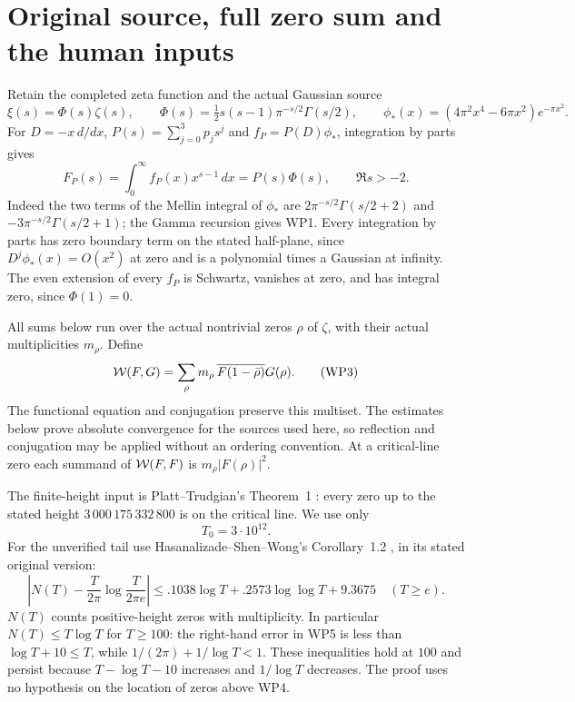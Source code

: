 \documentclass[11pt]{article}
\begin{document}
\section{Original source, full zero sum and the human inputs}
Retain the completed zeta function and the actual Gaussian source
\[
 \xi(s)=\Phi(s)\zeta(s),\qquad
 \Phi(s)=\tfrac12s(s-1)\pi^{-s/2}\Gamma(s/2),\qquad
 \phi_*(x)=(4\pi^2x^4-6\pi x^2)e^{-\pi x^2}.                 \tag{WP1}
\]
For $D=-x\,d/dx$, $P(s)=\sum_{j=0}^3p_js^j$ and
$f_P=P(D)\phi_*$, integration by parts gives
\[
 F_P(s)=\int_0^\infty f_P(x)x^{s-1}\,dx=P(s)\Phi(s),
                  \qquad \Re s>-2.                            \tag{WP2}
\]
Indeed the two terms of the Mellin integral of $\phi_*$ are
$2\pi^{-s/2}\Gamma(s/2+2)$ and
$-3\pi^{-s/2}\Gamma(s/2+1)$; the Gamma recursion gives WP1.
Every integration by parts has zero boundary term on the stated
half-plane, since $D^j\phi_*(x)=O(x^2)$ at zero and is a polynomial
times a Gaussian at infinity. The even extension of every $f_P$ is
Schwartz, vanishes at zero, and has integral zero, since $\Phi(1)=0$.

All sums below run over the actual nontrivial zeros $\rho$ of $\zeta$,
with their actual multiplicities $m_\rho$. Define
\[
 \mathcal W(F,G)=\sum_\rho m_\rho\,
       \overline{F(1-\bar\rho)}G(\rho).                         \tag{WP3}
\]
The functional equation and conjugation preserve this multiset.
The estimates below prove absolute convergence for the sources
used here, so reflection and conjugation may be applied without
an ordering convention. At a critical-line zero each summand of
$\mathcal W(F,F)$ is $m_\rho|F(\rho)|^2$.

The finite-height input is Platt--Trudgian's Theorem~1
\cite{swcert:PlattTrudgian}: every zero up to the stated height
$3\,000\,175\,332\,800$ is on the critical line. We use only
\[
                         T_0=3\cdot10^{12}.                    \tag{WP4}
\]
For the unverified tail use Hasanalizade--Shen--Wong's
Corollary~1.2 \cite{swcert:HSW}, in its stated original version:
\[
 \left|N(T)-\frac{T}{2\pi}\log\frac{T}{2\pi e}\right|
 \le .1038\log T+.2573\log\log T+9.3675\quad(T\ge e).          \tag{WP5}
\]
$N(T)$ counts positive-height zeros with multiplicity. In particular
$N(T)\le T\log T$ for $T\ge100$: the right-hand error in WP5 is
less than $\log T+10\le T$, while
$1/(2\pi)+1/\log T<1$. These inequalities hold at $100$ and
persist because $T-\log T-10$ increases and $1/\log T$ decreases.
The proof uses no hypothesis on the location of zeros above WP4.
\end{document}
